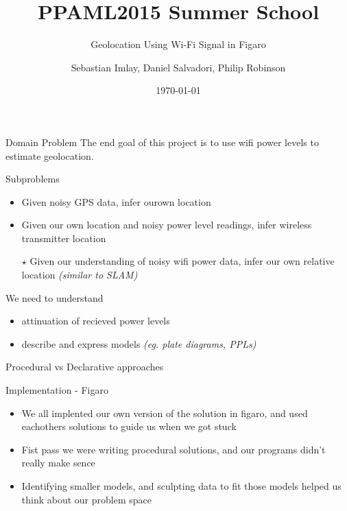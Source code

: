 \documentclass[11pt]{beamer}
\begin{document}
\title{PPAML2015 Summer School}

\subtitle{Geolocation Using Wi-Fi Signal in Figaro}

\author{Sebastian Imlay, Daniel Salvadori, Philip Robinson}


\date{\today}

\begin{frame}
  \titlepage
\end{frame}


\begin{frame}{Domain Problem}
The end goal of this project is to use wifi power levels to estimate geolocation.

Subproblems
\begin{itemize}
\item Given noisy GPS data, infer ourown location
\item Given our own location and noisy power level readings, infer wireless transmitter location
\item[$\star$] Given our understanding of noisy wifi power data, infer our own relative location {\em (similar to SLAM)}
\end{itemize}
We need to understand
\begin{itemize}
\item attinuation of recieved power levels
\item describe and express models {\em (eg. plate diagrams, PPLs)}
\end{itemize}
\end{frame}

\begin{frame}{Procedural vs Declarative approaches}
\end{frame}

\begin{frame}{Implementation - Figaro}
\begin{multicols}{2}
\resizebox{!}{1.5in}{
}
\columnbreak

\begin{itemize}
\item We all implented our own version of the solution in figaro, and used eachothers solutions to guide us when we got stuck
\item Fist pass we were writing procedural solutions, and our programs didn't really make sence
\item Identifying smaller models, and sculpting data to fit those models helped us think about our problem space
\end{itemize}
\end{multicols}

\end{frame}
\end{document}
